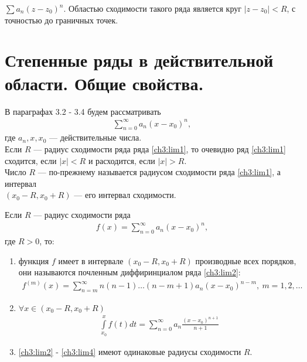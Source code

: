 \begin{example}
  $\sum a_n (z - z_0)^n$.
  Областью сходимости такого ряда является круг $|z - z_0| < R$, с точностью до
  граничных точек.
\end{example}

\section{Степенные ряды в действительной области. Общие свойства.}
В параграфах 3.2 - 3.4 будем рассматривать
\begin{gather}
  \sum\limits_{n = 0}^{\infty} a_n (x - x_0)^n,
  \label{ch3:lim1}
\end{gather}
где $a_n, x, x_0$ --- действительные числа. \\
Если $R$ --- радиус сходимости ряда ряда \eqref{ch3:lim1}, то очевидно ряд
\eqref{ch3:lim1} сходится, если $|x| < R$ и расходится, если $|x| > R$. \\
Число $R$ --- по-прежнему называется радиусом сходимости ряда \eqref{ch3:lim1},
а интервал \\ $(x_0 - R, x_0 + R)$ --- его интервал сходимости.

\begin{theorem}
  \label{th321}
  Если $R$ --- радиус сходимости ряда
  \begin{gather}
    f(x) = \sum\limits_{n = 0}^{\infty} a_n (x - x_0)^n,
    \label{ch3:lim2}
  \end{gather}
  где $R > 0$, то:
  \begin{enumerate}
    \item функция $f$ имеет в интервале $(x_0 - R, x_0 + R)$ производные всех
      порядков, они называются почленным диффиринциалом ряда \eqref{ch3:lim2}:
      \begin{gather}
        f^{(m)}(x) = \sum\limits_{n = m}^{\infty} n(n-1)\dots(n - m + 1)
        a_n(x - x_0)^{n-m}, \ m = 1, 2, \dots
        \label{ch3:lim3}
      \end{gather}
    \item $\forall x \in (x_0 - R, x_0 + R)$
      \begin{gather}
        \int\limits_{x_0}^x f(t) dt = \sum\limits_{n = 0}^{\infty} a_n
        \frac{(x - x_0)^{n+1}}{n+1}
        \label{ch3:lim4}
      \end{gather}
    \item \eqref{ch3:lim2} - \eqref{ch3:lim4} имеют одинаковые радиусы сходимости
      $R$.
  \end{enumerate}
\end{theorem}

